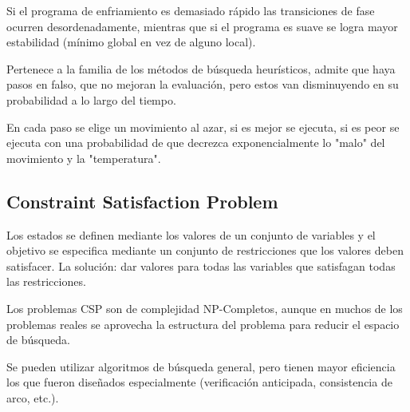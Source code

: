\documentclass[a4paper,10pt]{paper}
\begin{document}
Si el programa de enfriamiento es demasiado rápido las transiciones
de fase ocurren desordenadamente, mientras que si el programa es suave
se logra mayor estabilidad (mínimo global en vez de alguno local).

Pertenece a la familia de los métodos de búsqueda heurísticos, admite
que haya pasos en falso, que no mejoran la evaluación, pero estos van
disminuyendo en su probabilidad a lo largo del tiempo.

En cada paso se elige un movimiento al azar, si es mejor se ejecuta,
si es peor se ejecuta con una probabilidad de que decrezca
exponencialmente lo "malo" del movimiento y la "temperatura".

\subsection{Constraint Satisfaction Problem}
Los estados se definen mediante los valores de un conjunto de variables
y el objetivo se especifica mediante un conjunto de restricciones que
los valores deben satisfacer. La solución: dar valores para todas las
variables que satisfagan todas las restricciones.

Los problemas CSP son de complejidad NP-Completos, aunque en muchos de
los problemas reales se aprovecha la estructura del problema para
reducir el espacio de búsqueda.

Se pueden utilizar algoritmos de búsqueda general, pero tienen mayor
eficiencia los que fueron diseñados especialmente (verificación
anticipada, consistencia de arco, etc.).
\end{document}
